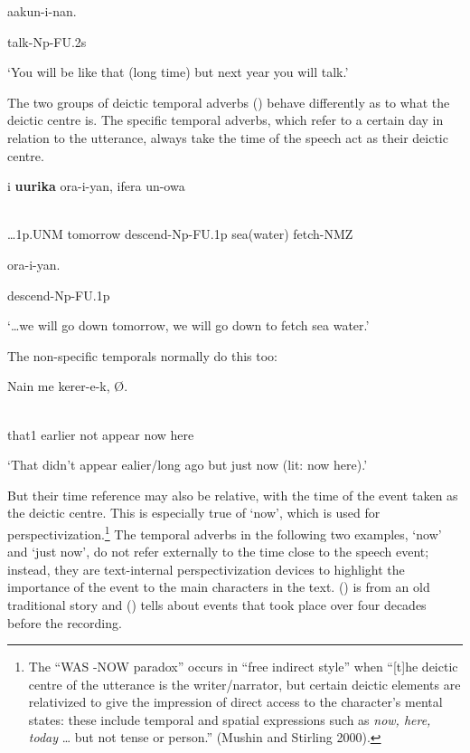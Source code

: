 aakun-i-nan.

talk-Np-FU.2s

`You will be like that (long time) but next year you will talk.'

The two groups of deictic temporal adverbs () behave differently as to what the deictic centre is. The specific temporal adverbs, which refer to a certain day in relation to the utterance, always take the time of the speech act as their deictic centre. 

\ea%
\label{ex:x1889}
\gll {\dots}i  \textbf{uurika}  ora-i-yan,  ifera  un-owa \\
      \\
\glt
\z

{\dots}1p.UNM  tomorrow  descend-Np-FU.1p  sea(water)  fetch-NMZ  

ora-i-yan.

descend-Np-FU.1p

`{\dots}we will go down tomorrow, we will go down to fetch sea water.'

The non-specific temporals normally do this too: 

\ea%
\label{ex:x1890}
\gll Nain    me  kerer-e-k,   \textstyleEmphasizedVernacularWords{}   {\O}. \\
      \\
\glt
\z

that1  earlier  not  appear  now  here  

`That didn't appear ealier/long ago but just now (lit: now here).'

But their time reference may also be relative, with the time of the event taken as the deictic centre. This is especially true of  `now', which is used for perspectivization.\footnote{The ``WAS -NOW paradox'' occurs in ``free indirect style'' when ``[t]he deictic centre of the utterance is the writer/narrator, but certain deictic elements are relativized to give the impression of direct access to the character's mental states: these include temporal and spatial expressions such as \textit{now, here, today} {\dots} but not tense or person.'' (Mushin and Stirling 2000).} The temporal adverbs in the following two examples,  `now' and  `just now', do not refer externally to the time close to the speech event; instead, they are text-internal perspectivization devices to highlight the importance of the event to the main characters in the text. () is from an old traditional story and () tells about events that took place over four decades before the recording. 

